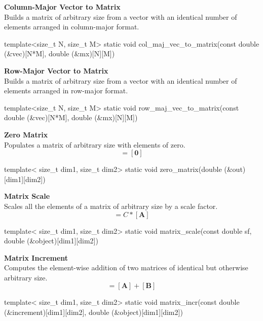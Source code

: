 \documentclass[11pt,fleqn]{report}
\begin{document}
\textbf{Column-Major Vector to Matrix}\\
Builds a matrix of arbitrary size from a vector with an identical 
number of elements arranged in column-major format.
\begin{code}
template<size_t N, size_t M>
static void col_maj_vec_to_matrix(const double (&vec)[N*M],
                                  double (&mx)[N][M])
\end{code}

\textbf{Row-Major Vector to Matrix}\\
Builds a matrix of arbitrary size from a vector with an identical 
number of elements arranged in row-major format.
\begin{code}
template<size_t N, size_t M>
static void row_maj_vec_to_matrix(const double (&vec)[N*M],
                                  double (&mx)[N][M])
\end{code}

\textbf{Zero Matrix}\\
Populates a matrix of arbitrary size with elements of zero.
\begin{equation*}
[\textbf{Y}] = [\textbf{0}]
\end{equation*}
\begin{code}
template< size_t dim1, size_t dim2>
static void zero_matrix(double (&out)[dim1][dim2])
\end{code}

\textbf{Matrix Scale}\\
Scales all the elements of a matrix of arbitrary size by a scale
factor.
\begin{equation*}
[\textbf{Y}] = C*[\textbf{A}]
\end{equation*}
\begin{code}
template< size_t dim1, size_t dim2>
static void matrix_scale(const double sf,
                         double (&object)[dim1][dim2])
\end{code}

\textbf{Matrix Increment}\\
Computes the element-wise addition of two matrices of identical 
but otherwise arbitrary size.
\begin{equation*}
[\textbf{Y}] = [\textbf{A}] + [\textbf{B}]
\end{equation*}
\begin{code}
template< size_t dim1, size_t dim2>
static void matrix_incr(const double (&increment)[dim1][dim2],
                        double (&object)[dim1][dim2])
\end{code}
\end{document}
